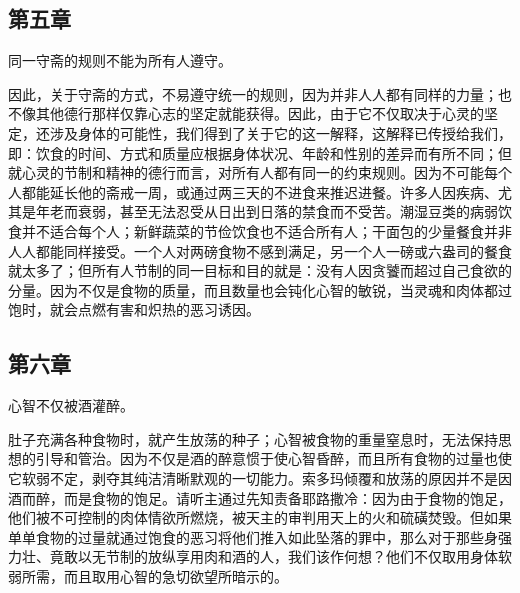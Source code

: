 
\subsection{第五章}

同一守斋的规则不能为所有人遵守。\par

因此，关于守斋的方式，不易遵守统一的规则，因为并非人人都有同样的力量；也不像其他德行那样仅靠心志的坚定就能获得。因此，由于它不仅取决于心灵的坚定，还涉及身体的可能性，我们得到了关于它的这一解释，这解释已传授给我们，即：饮食的时间、方式和质量应根据身体状况、年龄和性别的差异而有所不同；但就心灵的节制和精神的德行而言，对所有人都有同一的约束规则。因为不可能每个人都能延长他的斋戒一周，或通过两三天的不进食来推迟进餐。许多人因疾病、尤其是年老而衰弱，甚至无法忍受从日出到日落的禁食而不受苦。潮湿豆类的病弱饮食并不适合每个人；新鲜蔬菜的节俭饮食也不适合所有人；干面包的少量餐食并非人人都能同样接受。一个人对两磅食物不感到满足，另一个人一磅或六盎司的餐食就太多了；但所有人节制的同一目标和目的就是：没有人因贪饕而超过自己食欲的分量。因为不仅是食物的质量，而且数量也会钝化心智的敏锐，当灵魂和肉体都过饱时，就会点燃有害和炽热的恶习诱因。\par


\subsection{第六章}

心智不仅被酒灌醉。\par

肚子充满各种食物时，就产生放荡的种子；心智被食物的重量窒息时，无法保持思想的引导和管治。因为不仅是酒的醉意惯于使心智昏醉，而且所有食物的过量也使它软弱不定，剥夺其纯洁清晰默观的一切能力。索多玛倾覆和放荡的原因并不是因酒而醉，而是食物的饱足。请听主通过先知责备耶路撒冷：因为由于食物的饱足，他们被不可控制的肉体情欲所燃烧，被天主的审判用天上的火和硫磺焚毁。但如果单单食物的过量就通过饱食的恶习将他们推入如此坠落的罪中，那么对于那些身强力壮、竟敢以无节制的放纵享用肉和酒的人，我们该作何想？他们不仅取用身体软弱所需，而且取用心智的急切欲望所暗示的。\par


